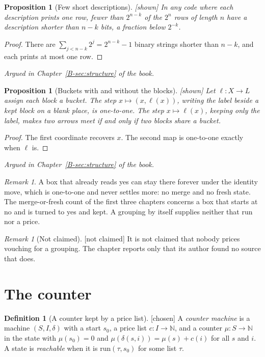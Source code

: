 \documentclass[11pt, a4paper]{article}
\theoremstyle{plain}
\newtheorem{proposition}[theorem]{Proposition}
\theoremstyle{definition}
\newtheorem{definition}[theorem]{Definition}
\theoremstyle{remark}
\newtheorem{remark}[theorem]{Remark}
\newcommand{\N}{\mathbb{N}}
\newcommand{\step}{\delta}
\newcommand{\cost}{c}
\newcommand{\run}{\mathrm{run}}
\newcommand{\argued}[1]{\par\noindent\textit{Argued in Chapter~\ref{B-#1} of the book.}\par}
\newcommand{\kind}[1]{\textup{[#1]}}
\begin{document}
\begin{proposition}[Few short descriptions]\label{spec:few-short} \kind{shown}
In any code where each description prints one row, fewer than $2^{n-k}$ of the $2^n$ rows of length $n$ have
a description shorter than $n-k$ bits, a fraction below $2^{-k}$.
\end{proposition}
\begin{proof}
There are $\sum_{j<n-k}2^j=2^{n-k}-1$ binary strings shorter than $n-k$, and each prints at most one row.
\end{proof}
\argued{sec:structure}

\begin{proposition}[Buckets with and without the blocks]\label{spec:buckets} \kind{shown}
Let $\ell:X\to L$ assign each block a bucket. The step $x\mapsto(x,\ell(x))$, writing the label beside a kept
block on a blank place, is one-to-one. The step $x\mapsto\ell(x)$, keeping only the label, makes two arrows
meet if and only if two blocks share a bucket.
\end{proposition}
\begin{proof}
The first coordinate recovers $x$. The second map is one-to-one exactly when $\ell$ is.
\end{proof}
\argued{sec:structure}

\begin{remark}
A box that already reads yes can stay there forever under the identity move, which is one-to-one and never
settles more: no merge and no fresh state. The merge-or-fresh count of the first three chapters concerns a box that starts at no and is turned to yes and kept. A grouping by itself
supplies neither that run nor a price.
\end{remark}

\begin{remark}[Not claimed]\label{spec:nobody-prices} \kind{not claimed}
It is not claimed that nobody prices vouching for a grouping. The chapter reports only that its author found
no source that does.
\end{remark}

\section{The counter}\label{spec:ch11}

\begin{definition}[A counter kept by a price list]\label{spec:counter-def} \kind{chosen}
A \emph{counter machine} is a machine $(S,I,\step)$ with a start $s_0$, a price list $\cost:I\to\N$, and a
counter $\mu:S\to\N$ in the state with $\mu(s_0)=0$ and $\mu(\step(s,i))=\mu(s)+\cost(i)$ for all $s$ and $i$.
A state is \emph{reachable} when it is $\run(\tau,s_0)$ for some list $\tau$.
\end{definition}
\end{document}
